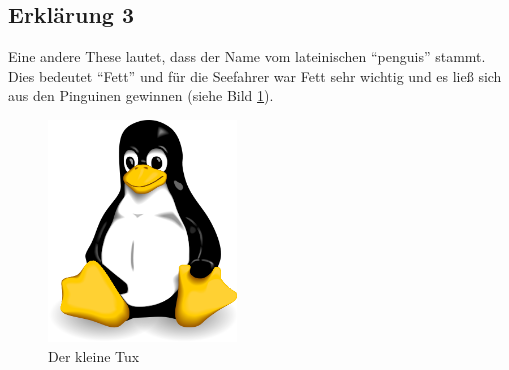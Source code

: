\subsection{Erklärung 3}
Eine andere These lautet, dass der Name vom lateinischen "`penguis"' stammt. Dies bedeutet "`Fett"' und für die Seefahrer war Fett sehr wichtig und es ließ sich aus den Pinguinen gewinnen (siehe Bild \ref{img:tux}).

\begin{figure}[H]
\begin{center}
\includegraphics[width=5cm]{bilder/tux.png}
\caption{Der kleine Tux}
\label{img:tux}
\end{center}
\end{figure}
